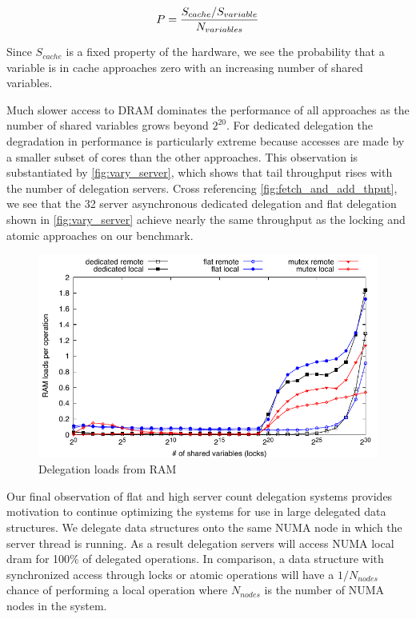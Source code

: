\documentclass{uicthesi}
\begin{document}
\begin{equation}
P = {{S_{cache} / S_{variable}} \over N_{variables}}
\label{eq:ram}
\end{equation}

Since $S_{cache}$ is a fixed property of the hardware, we see the probability that a variable is in cache approaches zero with an increasing number of shared variables. 

Much slower access to DRAM dominates the performance of all approaches as the number of shared variables grows beyond $2^{20}$. For dedicated delegation the degradation in performance is particularly extreme because accesses are made by a smaller subset of cores than the other approaches. This observation is substantiated by \ref{fig:vary_server}, which shows that tail throughput rises with the number of delegation servers. Cross referencing \ref{fig:fetch_and_add_thput}, we see that the 32 server asynchronous dedicated delegation and flat delegation shown in \ref{fig:vary_server} achieve nearly the same throughput as the locking and atomic approaches on our benchmark. 

\begin{figure}[ht!]
\centering
\includegraphics[width=0.9\columnwidth]{FIG/ram_accesses_per_op.pdf}
\caption{Delegation loads from RAM}
\label{fig:ram_loads}
\end{figure}

Our final observation of flat and high server count delegation systems provides motivation to continue optimizing the systems for use in large delegated data structures. We delegate data structures onto the same NUMA node in which the server thread is running. As a result delegation servers will access NUMA local dram for 100\% of delegated operations. In comparison, a data structure with synchronized access through locks or atomic operations will have a $1/N_{nodes}$ chance of performing a local operation where $N_{nodes}$ is the number of NUMA nodes in the system. 
\end{document}
